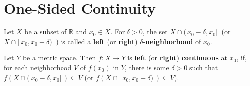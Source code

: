 \section{One-Sided Continuity}

Let \(X\) be a subset of \(\mathbb{R}\) and \(x_0 \in X\). For \(\delta > 0\), the set
\(X \cap (\ x_0 - \delta, x_0 ]\  \) (or \(X \cap [\ x_0, x_0 + \delta )\ \) ) is called 
a \textbf{left} (or \textbf{right}) \(\delta\)-\textbf{neighborhood} of \(x_0\). 

Let \(Y\) be a metric space. Then \(f \colon X \to Y\) is \textbf{left} (or \textbf{right})
\textbf{continuous} at \(x_0\), if, for each neighborhood \(V\) of \(f\left(x_0\right)\)
in \(Y\), there is some \(\delta > 0\) such that \(f\left(X \cap (\ x_0 - \delta, x_0  ]\ \right)
\subseteq V\) (or \(f\left(X \cap [\ x_0, x_0 + \delta  )\ \right) \subseteq V\)). 

